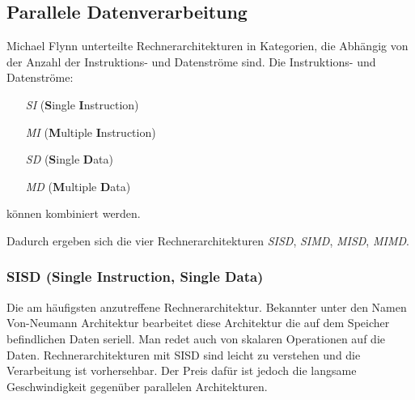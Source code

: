 \subsection{Parallele Datenverarbeitung}
\label{subsec:flynn}
Michael Flynn unterteilte Rechnerarchitekturen in Kategorien, die Abhängig von der Anzahl der Instruktions- und Datenströme sind. \newline
Die Instruktions- und Datenströme:
\begin{enumerate}
\item[\textit{SI}] (\textbf{S}ingle \textbf{I}nstruction)
\item[\textit{MI}] (\textbf{M}ultiple \textbf{I}nstruction) 
\item[\textit{SD}] (\textbf{S}ingle \textbf{D}ata) 
\item[\textit{MD}] (\textbf{M}ultiple \textbf{D}ata) 
\end{enumerate}
können kombiniert werden. \newline

Dadurch ergeben sich die vier Rechnerarchitekturen \textit{SISD}, \textit{SIMD}, \textit{MISD}, \textit{MIMD}.
\subsubsection*{SISD (Single Instruction, Single Data)}
Die am häufigsten anzutreffene Rechnerarchitektur.
Bekannter unter den Namen Von-Neumann Architektur bearbeitet diese Architektur die auf dem Speicher befindlichen Daten seriell.
Man redet auch von skalaren Operationen auf die Daten.
Rechnerarchitekturen mit SISD sind leicht zu verstehen und die Verarbeitung ist vorhersehbar.
Der Preis dafür ist jedoch die langsame Geschwindigkeit gegenüber parallelen Architekturen.
